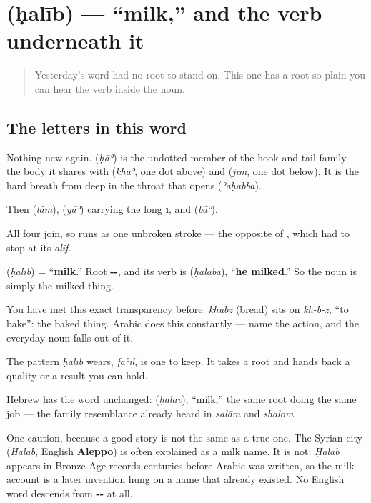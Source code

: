 \section[\texorpdfstring{\ar{حليب} (ḥalīb)}{حليب (ḥalīb)}]{ (ḥalīb) — \textquotedblleft{}milk,\textquotedblright{} and the verb underneath it}

\label{lesson:AR-C33-halib}



\begin{quote}
Yesterday's word had no root to stand on. This one has a root so plain you can hear the verb inside the noun.
\end{quote}

\subsection*{The letters in this word}
Nothing new again. \textbf{} (\emph{ḥāʾ}) is the undotted member of the hook-and-tail family — the body it shares with \textbf{} (\emph{khāʾ}, one dot above) and \textbf{} (\emph{jīm}, one dot below). It is the hard breath from deep in the throat that opens \textbf{} (\emph{ʾaḥabba}).

Then \textbf{} (\emph{lām}), \textbf{} (\emph{yāʾ}) carrying the long \textbf{ī}, and \textbf{} (\emph{bāʾ}).

All four join, so \textbf{} runs as one unbroken stroke — the opposite of \textbf{}, which had to stop at its \emph{alif}.

\begin{cousinweb}
\textbf{} (\emph{ḥalīb}) = \textquotedblleft{}\textbf{milk}.\textquotedblright{} Root \textbf{--}, and its verb is \textbf{} (\emph{ḥalaba}), \textquotedblleft{}\textbf{he milked}.\textquotedblright{} So the noun is simply the milked thing.

You have met this exact transparency before. \emph{khubz} (bread) sits on \emph{kh-b-z}, \textquotedblleft{}to bake\textquotedblright{}: the baked thing. Arabic does this constantly — name the action, and the everyday noun falls out of it.

The pattern \emph{ḥalīb} wears, \emph{faʿīl}, is one to keep. It takes a root and hands back a quality or a result you can hold.

Hebrew has the word unchanged: \textbf{} (\emph{ḥalav}), \textquotedblleft{}milk,\textquotedblright{} the same root doing the same job — the family resemblance already heard in \emph{salām} and \emph{shalom}.

One caution, because a good story is not the same as a true one. The Syrian city \textbf{} (\emph{Ḥalab}, English \textbf{Aleppo}) is often explained as a milk name. It is not: \emph{Ḥalab} appears in Bronze Age records centuries before Arabic was written, so the milk account is a later invention hung on a name that already existed. No English word descends from \textbf{--} at all.
\end{cousinweb}

